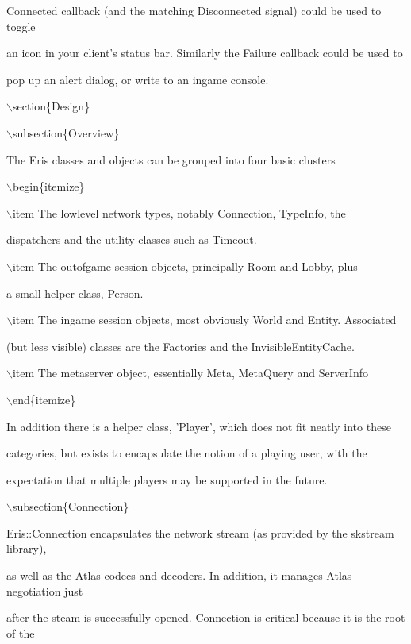 \documentclass[12pt]{article}
\begin{document}
Connected callback (and the matching Disconnected signal) could be used to toggle

an icon in your client's status bar. Similarly the Failure callback could be used to

pop up an alert dialog, or write to an ingame console.



\ensuremath{\backslash}section\{Design\}



\ensuremath{\backslash}subsection\{Overview\}



The Eris classes and objects can be grouped into four basic clusters

\ensuremath{\backslash}begin\{itemize\}

\ensuremath{\backslash}item The lowlevel network types, notably Connection, TypeInfo, the

dispatchers and the utility classes such as Timeout.

\ensuremath{\backslash}item The outofgame session objects, principally Room and Lobby, plus

a small helper class, Person.

\ensuremath{\backslash}item The ingame session objects, most obviously World and Entity. Associated

(but less visible) classes are the Factories and the InvisibleEntityCache.

\ensuremath{\backslash}item The metaserver object, essentially Meta, MetaQuery and ServerInfo

\ensuremath{\backslash}end\{itemize\}



In addition there is a helper class, 'Player', which does not fit neatly into these

categories, but exists to encapsulate the notion of a playing user, with the

expectation that multiple players may be supported in the future.



\ensuremath{\backslash}subsection\{Connection\}



Eris::Connection encapsulates the network stream (as provided by the skstream library),

as well as the Atlas codecs and decoders. In addition, it manages Atlas negotiation just

after the steam is successfully opened. Connection is critical because it is the root of the
\end{document}
